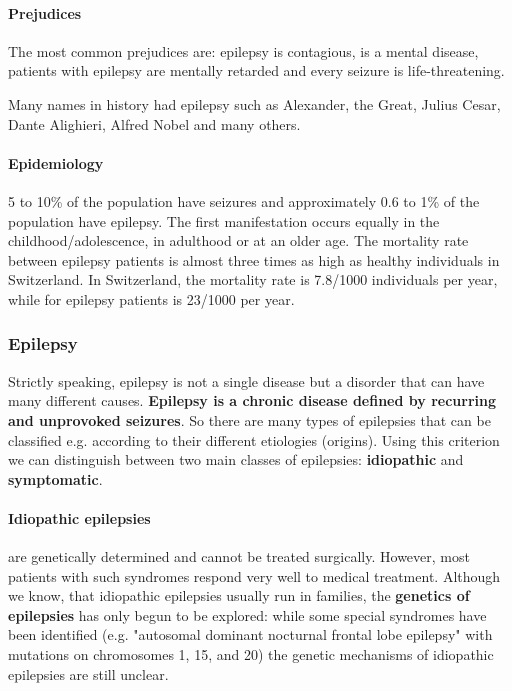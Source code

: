 \documentclass[12pt,article,oneside,a4paper]{memoir}
\begin{document}
\paragraph{Prejudices} The most common prejudices are: epilepsy is contagious, is a mental disease, patients with epilepsy are mentally retarded and every seizure is life-threatening.

Many names in history had epilepsy such as Alexander, the Great, Julius Cesar, Dante Alighieri, Alfred Nobel and many others.

\paragraph{Epidemiology}
5 to 10\% of the population have seizures and approximately 0.6 to 1\% of the population have epilepsy. The first manifestation occurs equally in the childhood/adolescence, in adulthood or at an older age.
The mortality rate between epilepsy patients is almost three times as high as healthy individuals in Switzerland. In Switzerland, the mortality rate is 7.8/1000 individuals per year, while for epilepsy patients is 23/1000 per year.

\subsubsection{Epilepsy}
Strictly speaking, epilepsy is not a single disease but a disorder that can have many different causes. \textbf{Epilepsy is a chronic disease defined by recurring and unprovoked seizures}.
So there are many types of epilepsies that can be classified e.g. according to their different etiologies (origins). Using this criterion we can distinguish between two main classes of epilepsies: \textbf{idiopathic} and \textbf{symptomatic}.

\paragraph{Idiopathic epilepsies} are genetically determined and cannot be treated surgically. However, most patients with such syndromes respond very well to medical treatment. Although we know, that idiopathic epilepsies usually run in families, the \textbf{genetics of epilepsies} has only begun to be explored: while some special syndromes have been identified (e.g. "autosomal dominant nocturnal frontal lobe epilepsy" with mutations on chromosomes 1, 15, and 20) the genetic mechanisms of idiopathic epilepsies are still unclear.
\end{document}
